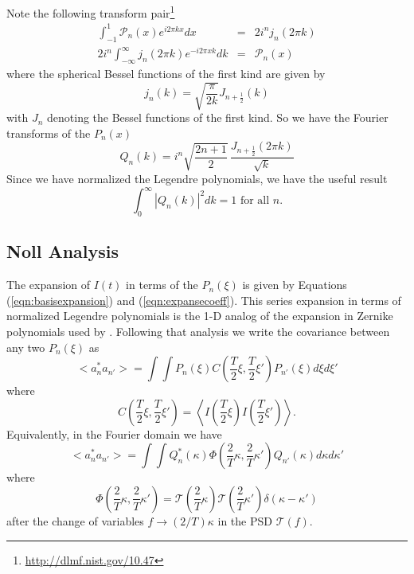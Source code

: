\documentclass[10pt,preprint]{aastex631}
\begin{document}
Note the following transform pair\footnote{\url{http://dlmf.nist.gov/10.47}}
\begin{eqnarray}
\int_{-1}^{1} \mathscr{P}_n(x) e^{i2\pi k x} dx & = & 2 i^n j_n(2\pi k)\\
2 i^n \int_{-\infty}^{\infty} j_n(2\pi k) e^{-i2\pi x k} dk &=& \mathscr{P}_n(x)
\end{eqnarray}
where the spherical Bessel functions of the first kind are given by
\begin{equation}
j_n(k) = \sqrt{\frac{\pi}{2k}}J_{n+\frac{1}{2}}(k)
\end{equation}
with $J_n$ denoting the Bessel functions of the first kind.  So we have the Fourier transforms of the $P_n(x)$ 
\begin{equation}
Q_n(k) = i^n \sqrt{\frac{2n+1}{2}}\, \frac{J_{n+\frac{1}{2}}(2\pi k)}{\sqrt{k}}
\end{equation}
Since we have normalized the Legendre polynomials, we have the useful result
\begin{equation}
\int_0^\infty \left| Q_n(k) \right|^2 dk = 1 \mbox{ for all }n.
\end{equation}

\subsection{Noll Analysis}

The expansion of $I(t)$ in terms of the $P_n(\xi)$ is given by Equations (\ref{eqn:basisexpansion}) and (\ref{eqn:expansecoeff}).  This series expansion in terms of normalized Legendre polynomials is the 1-D analog of the expansion in Zernike polynomials used by \citet{1976JOSA...66..207N}.  Following that analysis we write the covariance between any two $P_n(\xi)$ as
\begin{equation}
<a_n^* a_{n'}> = \int \int P_n(\xi) C\left(\frac{T}{2}\xi, \frac{T}{2}\xi' \right) P_{n'}(\xi) d\xi d\xi' 
\end{equation}
where
\begin{equation}
C\left(\frac{T}{2}\xi, \frac{T}{2}\xi' \right) = \left<I\left(\frac{T}{2}\xi\right)I\left(\frac{T}{2}\xi'\right) \right>.
\end{equation}
Equivalently, in the Fourier domain we have
\begin{equation}
<a_n^* a_{n'}> = \int \int Q_n^*(\kappa) \Phi \left(\frac{2}{T}\kappa, \frac{2}{T}\kappa' \right) Q_{n'}(\kappa) d\kappa d\kappa' 
\end{equation}
where
\begin{equation}
\Phi \left(\frac{2}{T}\kappa, \frac{2}{T}\kappa' \right) =  \mathcal{T}\left(\frac{2}{T}\kappa \right) \mathcal{T}\left(\frac{2}{T} \kappa' \right) \delta(\kappa-\kappa')
\end{equation}
after the change of variables $f \rightarrow (2/T)\kappa$ in the PSD $\mathcal{T}(f)$.
\end{document}
